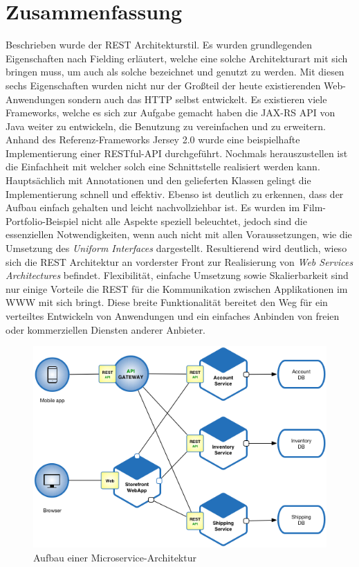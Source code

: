 \documentclass[fleqn,10.5pt,ngerman]{SelfArx}
\begin{document}
\section{Zusammenfassung}
Beschrieben wurde der REST Architekturstil. Es wurden grundlegenden Eigenschaften nach Fielding erläutert, welche eine solche Architekturart mit sich bringen muss, um auch als solche bezeichnet und genutzt zu werden. Mit diesen sechs Eigenschaften wurden nicht nur der Großteil der heute existierenden Web-Anwendungen sondern auch das HTTP selbst entwickelt. Es existieren viele Frameworks, welche es sich zur Aufgabe gemacht haben die JAX-RS API von Java weiter zu entwickeln, die Benutzung zu vereinfachen und zu erweitern. Anhand des Referenz-Frameworks Jersey 2.0 wurde eine beispielhafte Implementierung einer RESTful-API durchgeführt. Nochmals herauszustellen ist die Einfachheit mit welcher solch eine Schnittstelle realisiert werden kann. Hauptsächlich mit Annotationen und den gelieferten Klassen gelingt die Implementierung schnell und effektiv. Ebenso ist deutlich zu erkennen, dass der Aufbau einfach gehalten und leicht nachvollziehbar ist. Es wurden im Film-Portfolio-Beispiel nicht alle Aspekte speziell beleuchtet, jedoch sind die essenziellen Notwendigkeiten, wenn auch nicht mit allen Voraussetzungen, wie die Umsetzung des \textit{Uniform Interfaces} dargestellt. Resultierend wird deutlich, wieso sich die REST Architektur an vorderster Front zur Realisierung von \textit{Web Services Architectures} befindet. Flexibilität, einfache Umsetzung sowie Skalierbarkeit sind nur einige Vorteile die REST für die Kommunikation zwischen Applikationen im WWW mit sich bringt. Diese breite Funktionalität bereitet den Weg für ein verteiltes Entwickeln von Anwendungen und ein einfaches Anbinden von freien oder kommerziellen Diensten anderer Anbieter.
\begin{figure}[ht]\centering
	\includegraphics[width=8.5 cm]{Abbildungen/Microservice_Architecture.png}
	\caption{Aufbau einer Microservice-Architektur}
	\label{fig:micro}
\end{figure}
\end{document}
